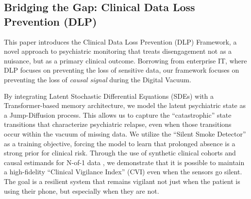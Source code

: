 \subsection{Bridging the Gap: Clinical Data Loss Prevention (DLP)}
This paper introduces the Clinical Data Loss Prevention (DLP) Framework, a novel approach to psychiatric monitoring that treats disengagement not as a nuisance, but as a primary clinical outcome. Borrowing from enterprise IT, where DLP focuses on preventing the loss of sensitive data, our framework focuses on preventing the loss of \textit{causal signal} during the Digital Vacuum.

By integrating Latent Stochastic Differential Equations (SDEs) with a Transformer-based memory architecture, we model the latent psychiatric state as a Jump-Diffusion process. This allows us to capture the ``catastrophic'' state transitions that characterize psychiatric relapse, even when those transitions occur within the vacuum of missing data. We utilize the ``Silent Smoke Detector'' as a training objective, forcing the model to learn that prolonged absence is a strong prior for clinical risk. Through the use of synthetic clinical cohorts and causal estimands for N-of-1 data \cite{cai2026causal}, we demonstrate that it is possible to maintain a high-fidelity ``Clinical Vigilance Index'' (CVI) even when the sensors go silent. The goal is a resilient system that remains vigilant not just when the patient is using their phone, but especially when they are not.
